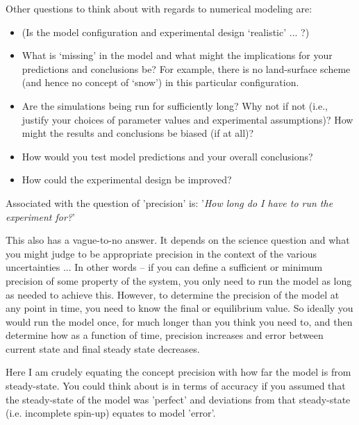 \vspace{1mm}
Other questions to think about with regards to numerical modeling are:

\begin{itemize}[noitemsep]
\setlength{\itemindent}{.2in}
\vspace{1mm}
\item  (Is the model configuration and experimental design ‘realistic’ ... ?)
\vspace{1mm}
\item  What is ‘missing’ in the model and what might the implications for your predictions and conclusions be? For example, there is no land-surface scheme (and hence no concept of ‘snow’) in this particular configuration.
\vspace{1mm}
\item Are the simulations being run for sufficiently long? Why not if not (i.e., justify your choices of parameter values and experimental assumptions)? How might the results and conclusions be biased (if at all)?
\vspace{1mm}
\item How would you test model predictions and your overall conclusions?
\vspace{1mm}
\item How could the experimental design be improved?
\end{itemize}

\vspace{1mm}
\noindent Associated with the question of 'precision' is: '\textit{How long do I have to run the experiment for?}'

This also has a vague-to-no answer. It depends on the science question and what you might judge to be appropriate precision in the context of the various uncertainties ... In other words -- if you can define a sufficient or minimum precision of some property of the system, you only need to run the model as long as needed to achieve this. However, to determine  the precision of the model at any point in time, you need to know the final or equilibrium value. So ideally you would run the model once, for much longer than you think you need to, and then determine how as a function of time, precision increases and error between current state and final steady state decreases.

Here I am crudely equating the concept precision with how far the model is from steady-state. You could think about is in terms of accuracy if you assumed that the steady-state of the model was 'perfect' and deviations from that steady-state (i.e. incomplete spin-up) equates to model 'error'.

